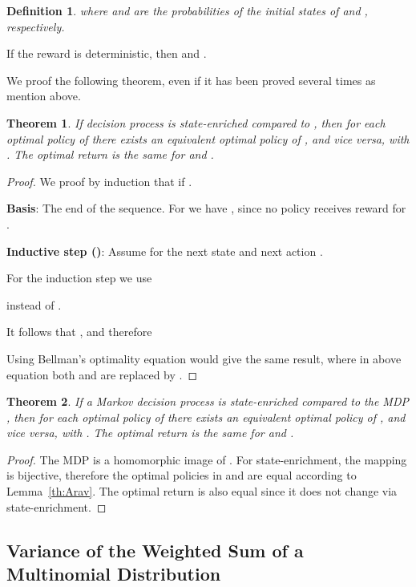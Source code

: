 \documentclass{article}
\newtheorem{theoremA}{Theorem}
\newtheorem{definitionA}{Definition}
\begin{document}
\begin{appendices}
\begin{definitionA}
 where  and  are the probabilities of the initial states
 of  and , respectively.
\end{definitionA}
If the reward is deterministic, then
 and
.




We proof the following theorem, even if it has been proved several
times as mention above.
\begin{theoremA}
  If decision process  is state-enriched compared to
  , then for each optimal policy  of  there
  exists an equivalent optimal policy  of , and vice
  versa, with . The
  optimal return is the same for  and .
\end{theoremA}




\begin{proof}
  We proof by induction that
   if
  .

  {\bf Basis}: The end of the sequence.
  For  we have
  , since
  no policy receives reward for .
  
{\bf Inductive step ()}: Assume  for the next state  and next action .

For the induction step  we use

instead of .

It follows that
, and therefore



Using Bellman's optimality equation would give the same result,
where in above equation
both  and  are
replaced by .
\end{proof}


\begin{theoremA}
  If a Markov decision process  is state-enriched compared to
  the MDP , then for each optimal policy  of  there
  exists an equivalent optimal policy  of , and vice
  versa, with . The
  optimal return is the same for  and .
\end{theoremA}
\begin{proof}
  The MDP  is a homomorphic image of .
  For state-enrichment, the mapping  is bijective, therefore the
  optimal policies in  and  are equal according to
  Lemma~\ref{th:Arav}. The optimal return is also equal since it does
  not change via state-enrichment.
\end{proof}


\subsection{Variance of the Weighted Sum of a Multinomial Distribution}


\end{appendices}
\end{document}

